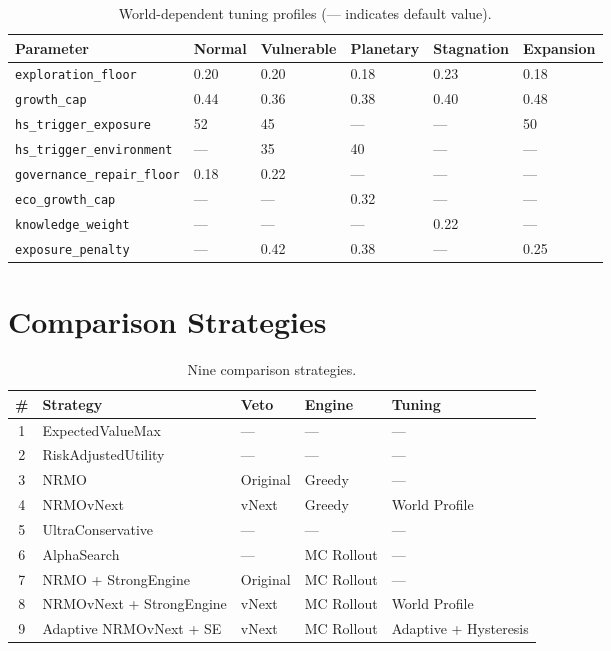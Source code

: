 \begin{table}[ht]
\centering
\scriptsize
\begin{tabularx}{\linewidth}{lXXXXX}
\toprule
\textbf{Parameter} & \textbf{Normal} & \textbf{Vulnerable} &
\textbf{Planetary} & \textbf{Stagnation} & \textbf{Expansion} \\
\midrule
\texttt{exploration\_floor} & 0.20 & 0.20 & 0.18 & 0.23 & 0.18 \\
\texttt{growth\_cap} & 0.44 & 0.36 & 0.38 & 0.40 & 0.48 \\
\texttt{hs\_trigger\_exposure} & 52 & 45 & --- & --- & 50 \\
\texttt{hs\_trigger\_environment} & --- & 35 & 40 & --- & --- \\
\texttt{governance\_repair\_floor} & 0.18 & 0.22 & --- & --- & --- \\
\texttt{eco\_growth\_cap} & --- & --- & 0.32 & --- & --- \\
\texttt{knowledge\_weight} & --- & --- & --- & 0.22 & --- \\
\texttt{exposure\_penalty} & --- & 0.42 & 0.38 & --- & 0.25 \\
\bottomrule
\end{tabularx}
\caption[World-dependent profiles]{World-dependent tuning profiles
(--- indicates default value).}
\label{tab:vnext-world-profiles}
\end{table}

\section{Comparison Strategies}
\label{sec:vnext-strategies}

\begin{table}[ht]
\centering
\small
\begin{tabularx}{\linewidth}{cXXXX}
\toprule
\textbf{\#} & \textbf{Strategy} & \textbf{Veto} & \textbf{Engine} &
\textbf{Tuning} \\
\midrule
1 & ExpectedValueMax & --- & --- & --- \\
2 & RiskAdjustedUtility & --- & --- & --- \\
3 & NRMO & Original & Greedy & --- \\
4 & NRMOvNext & vNext & Greedy & World Profile \\
5 & UltraConservative & --- & --- & --- \\
6 & AlphaSearch & --- & MC Rollout & --- \\
7 & NRMO + StrongEngine & Original & MC Rollout & --- \\
8 & NRMOvNext + StrongEngine & vNext & MC Rollout & World
Profile \\
9 & Adaptive NRMOvNext + SE & vNext & MC Rollout
& Adaptive + Hysteresis \\
\bottomrule
\end{tabularx}
\caption[Nine comparison strategies]{Nine comparison strategies.}
\label{tab:vnext-strategies}
\end{table}

